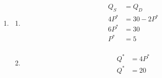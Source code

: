 \documentclass{article}
\begin{document}
\begin{enumerate}
\begin{enumerate}
	\end{enumerate}
	
\item

	\begin{enumerate}
	
	\item
	\begin{align*}
	Q_S &= Q_D \\
	4P^* &= 30 - 2P^* \\
	6P^* &= 30 \\
	P^* &= 5 \\
	\end{align*}
	
	\item
	\begin{align*}
	Q^* &= 4P^* \\
	Q^* &= 20
	\end{align*}
	
	\end{enumerate}

\end{enumerate}
\end{document}
